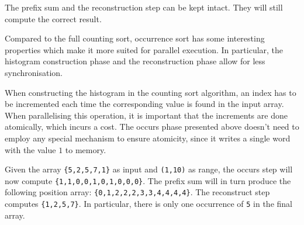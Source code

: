 The prefix sum and the reconstruction step can be kept intact. They
will still compute the correct result.

Compared to the full counting sort, occurrence sort has some
interesting properties which make it more suited for parallel execution.
In particular, the histogram construction phase and the reconstruction
phase allow for less synchronisation.

When constructing the histogram in the counting sort algorithm, an
index has to be incremented each time the corresponding value is found
in the input array. When parallelising this operation, it is important
that the increments are done atomically, which incurs a cost. The occurs
phase presented above doesn't need to employ any special mechanism to
ensure atomicity, since it writes a single word with the value $1$ to
memory.

Given the array \verb!{5,2,5,7,1}! as input and \verb!(1,10)!  as
range, the occurs step will now compute
\verb!{1,1,0,0,1,0,1,0,0,0}!. The prefix sum will in turn produce the
following position array: \verb!{0,1,2,2,2,3,3,4,4,4,4}!. The
reconstruct step computes \verb!{1,2,5,7}!. In particular,
there is only one occurrence of \verb!5! in the final array.
